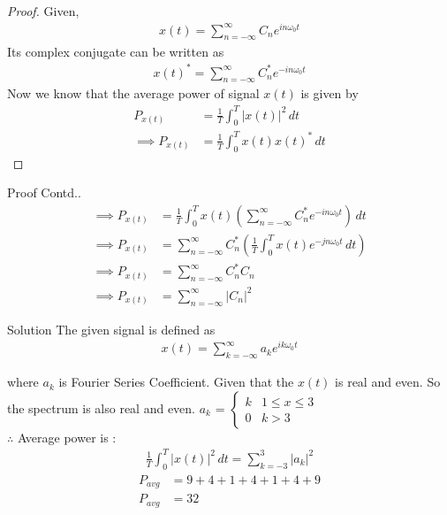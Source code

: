\documentclass{beamer}
\providecommand{\brak}[1]{\ensuremath{\left(#1\right)}}
\begin{document}
\begin{frame}
\begin{proof}
Given,
\begin{align}
    x(t) = \sum_{n=-\infty}^{\infty}C_{n}e^{in\omega_0t}     
\end{align}
Its complex conjugate can be written as
\begin{align}
    x(t)^* = \sum_{n=-\infty}^{\infty}C_{n}^*e^{-in\omega_0t}
\end{align}
Now we know that the average power of signal $x(t)$ is given by
\begin{align}
    P_{x(t)}&=\frac{1}{T}\int_{0}^{T}\lvert x(t)\rvert^2\,dt\\
    \implies P_{x(t)} &= \frac{1}{T}\int_{0}^{T}x(t)x(t)^*\,dt
\end{align}
\end{proof}
\end{frame}
\begin{frame}
\begin{block}{Proof Contd..}
\begin{align}
    \implies P_{x(t)} &= \frac{1}{T}\int_{0}^{T}x(t)\brak{\sum_{n=-\infty}^{\infty}C_{n}^*e^{-in\omega_0t}}\,dt\\
    \implies P_{x(t)} &= \sum_{n=-\infty}^{\infty}C_{n}^*\brak{\frac{1}{T}\int_{0}^{T}x(t)e^{-jn\omega_0t}\,dt}\\
    \implies P_{x(t)} &= \sum_{n=-\infty}^{\infty}C_{n}^*C_{n}\\
    \implies P_{x(t)} &= \sum_{n=-\infty}^{\infty}\lvert C_n\rvert^2
\end{align}
\end{block}
\end{frame}
\begin{frame}{Solution}
The given signal is defined as 
\begin{align}
    x(t) = \sum_{k=-\infty}^{\infty}a_{k}e^{ik\omega_0t}
\end{align}

where $a_k$ is Fourier Series Coefficient.
Given that the $x(t)$ is real and even. So the spectrum is also real and even.
$a_k$ = $\begin{cases} 
            k & 1\leq x\leq 3\\
            0 & k>3
        \end{cases}$\\  
$\therefore$ Average power is :
\begin{align}
    \frac{1}{T}\int_{0}^{T}\lvert x(t)\rvert^2\,dt = \sum_{k=-3}^{3}\lvert a_k\rvert^2
\end{align}
\begin{align}
    P_{avg} &= 9+4+1+4+1+4+9\\
    P_{avg} &= 32
\end{align}
\end{frame}
\end{document}

